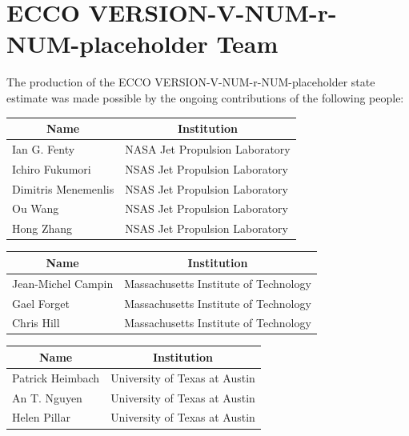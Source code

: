 \pagebreak
\section{ECCO VERSION-V-NUM-r-NUM-placeholder Team}
The production of the ECCO VERSION-V-NUM-r-NUM-placeholder state estimate was made possible by the ongoing contributions of the following people:

\vspace{.5cm}

\vspace{.25cm}
\begin{center}
\begin{tabular}{ m{} m{}}
    \multicolumn{1}{c}{\textbf{Name}} & \multicolumn{1}{c}{\textbf{Institution}} \\ \hline
    Ian G. Fenty & NASA Jet Propulsion Laboratory\\ \hline
    Ichiro Fukumori & NSAS Jet Propulsion Laboratory \\ \hline
    Dimitris Menemenlis & NSAS Jet Propulsion Laboratory\\ \hline
    Ou Wang & NSAS Jet Propulsion Laboratory \\ \hline
    Hong Zhang & NSAS Jet Propulsion Laboratory\\ \hline
\end{tabular}
\end{center}

\vspace{.25cm}

\vspace{.25cm}
\begin{center}
\begin{tabular}{m{} m{} }
    \multicolumn{1}{c}{\textbf{Name}} & \multicolumn{1}{c}{\textbf{Institution}} \\ \hline
    Jean-Michel Campin & Massachusetts Institute of Technology \\ \hline
    Gael Forget & Massachusetts Institute of Technology \\ \hline
    Chris Hill & Massachusetts Institute of Technology \\ \hline
\end{tabular}
\end{center}

\vspace{.25cm}

\vspace{.25cm}
\begin{center}
\begin{tabular}{m{} m{} }
    \multicolumn{1}{c}{\textbf{Name}} & \multicolumn{1}{c}{\textbf{Institution}} \\ \hline
    Patrick Heimbach & University of Texas at Austin \\ \hline
    An T. Nguyen & University of Texas at Austin \\ \hline
    Helen Pillar & University of Texas at Austin \\ \hline
\end{tabular}
\end{center}

